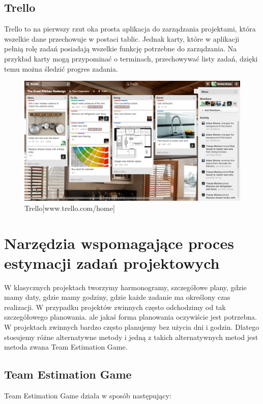 \subsection{Trello}

Trello to na pierwszy rzut oka prosta aplikacja do zarządzania projektami,
która wszelkie dane przechowuje w postaci tablic.
Jednak karty, które w aplikacji pełnią rolę zadań posiadają wszelkie funkcję potrzebne do zarządzania.
Na przykład karty mogą przypominać o terminach, przechowywać listy zadań,
dzięki temu można śledzić progres zadania.

\begin{figure}[H]
	\centering\includegraphics[width=.8\textwidth]{img/01.png}
	\caption{Trello[www.trello.com/home]}\label{rys:trello}%
\end{figure}

\section{Narzędzia wspomagające proces estymacji zadań projektowych}

W klasycznych projektach tworzymy harmonogramy, szczegółowe plany, gdzie mamy daty,
gdzie mamy godziny, gdzie każde zadanie ma określony czas realizacji.
W przypadku projektów zwinnych często odchodzimy od tak szczegółowego planowania.
ale jakaś forma planowania oczywiście jest potrzebna.
W projektach zwinnych bardzo często planujemy bez użycia dni i godzin.
Dlatego stosujemy różne alternatywne metody i jedną z takich alternatywnych metod
jest metoda zwana Team Estimation Game.

\subsection{Team Estimation Game}

Team Estimation Game działa w sposób następujący:


